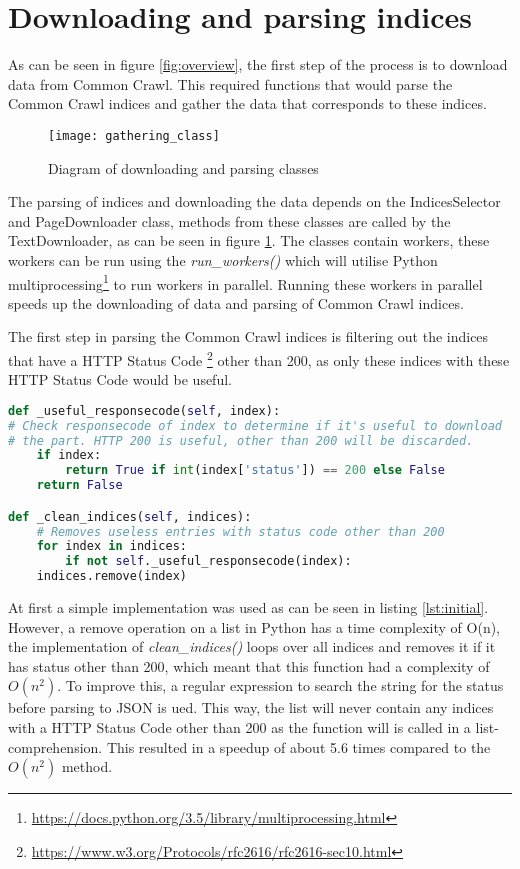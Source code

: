 \section{Downloading and parsing indices}

As can be seen in figure \ref{fig:overview}, the first step of the process is to download data from Common Crawl. This required functions that would parse the Common Crawl indices and gather the data that corresponds to these indices. 

\begin{figure}[H]
\centering
\texttt{[image: gathering\_class]}
\caption{Diagram of downloading and parsing classes}
\label{fig:gathering_class}
\end{figure}

The parsing of indices and downloading the data depends on the IndicesSelector and PageDownloader class, methods from these classes are called by the TextDownloader, as can be seen in figure \ref{fig:gathering_class}. The classes contain workers, these workers can be run  using the \textit{run\_workers()} which will utilise Python multiprocessing\footnote{\url{https://docs.python.org/3.5/library/multiprocessing.html}} to run workers in parallel. Running these workers in parallel speeds up the downloading of data and parsing of Common Crawl indices.

The first step in parsing the Common Crawl indices is filtering out the indices that have a HTTP Status Code \footnote{\url{https://www.w3.org/Protocols/rfc2616/rfc2616-sec10.html}} other than 200, as only these indices with these HTTP Status Code would be useful. 

\begin{lstlisting}[language=Python, caption=Initial implementation, label={lst:initial}]
def _useful_responsecode(self, index):
# Check responsecode of index to determine if it's useful to download
# the part. HTTP 200 is useful, other than 200 will be discarded.
    if index:
        return True if int(index['status']) == 200 else False
    return False

def _clean_indices(self, indices):
    # Removes useless entries with status code other than 200
    for index in indices:
        if not self._useful_responsecode(index):
    indices.remove(index)
\end{lstlisting}

At first a simple implementation was used as can be seen in listing \ref{lst:initial}. However, a remove operation on a list in Python has a time complexity of O(n), the implementation of \textit{clean\_indices()} loops over all indices and removes it if it has status other than 200, which meant that this function had a complexity of $O(n^2)$. To improve this, a regular expression to search the string for the status before parsing to JSON is ued. This way, the list will never contain any indices with a HTTP Status Code other than 200 as the function will is called in a list-comprehension. This resulted in a speedup of about 5.6 times compared to the $O(n^2)$ method.

